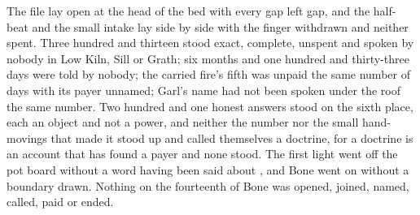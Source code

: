 The file lay open at the head of the bed with every gap left gap, and the half-beat and the small intake lay side by side with the finger withdrawn and neither spent. Three hundred and thirteen stood exact, complete, unspent and spoken by nobody in Low Kiln, Sill or Grath; six months and one hundred and thirty-three days were told by nobody; the carried fire's fifth was unpaid the same number of days with its payer unnamed; Garl's name had not been spoken under the roof the same number. Two hundred and one honest answers stood on the sixth place, each an object and not a power, and neither the number nor the small hand-movings that made it stood up and called themselves a doctrine, for a doctrine is an account that has found a payer and none stood. The first light went off the pot board without a word having been said about , and Bone went on without a boundary drawn. Nothing on the fourteenth of Bone was opened, joined, named, called, paid or ended.
